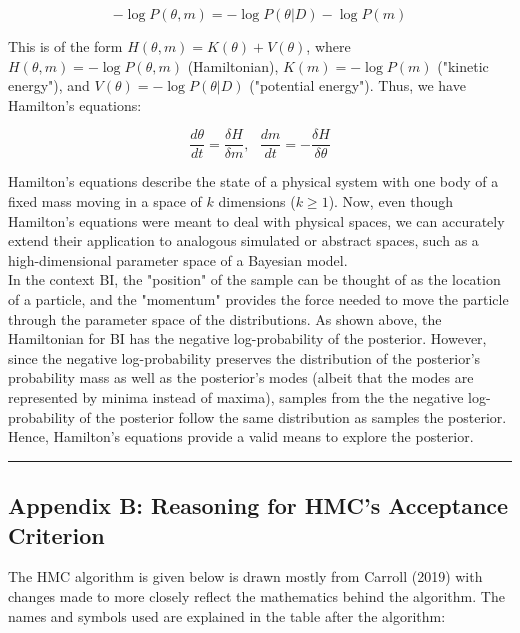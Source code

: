 \documentclass[conference]{IEEEtran}
\begin{document}
\begin{equation*}
	- \log P(\theta, m) = - \log P(\theta|D) - \log P(m)
\end{equation*}

This is of the form $H(\theta, m) = K(\theta) + V(\theta)$, where $H(\theta, m) = - \log P(\theta, m)$ (Hamiltonian),  $K(m) = - \log P(m)$ ("kinetic energy"), and $V(\theta) = - \log P(\theta|D)$ ("potential energy"). Thus, we have Hamilton's equations:

\begin{equation*}
	\frac{d \theta}{dt} = \frac{\delta H}{\delta m}, \text{ } \frac{dm}{dt} = - \frac{\delta H}{\delta \theta}
\end{equation*}

Hamilton's equations describe the state of a physical system with one body of a fixed mass moving in a space of $k$ dimensions ($k \geq 1$). Now, even though Hamilton's equations were meant to deal with physical spaces, we can accurately extend their application to analogous simulated or abstract spaces, such as a high-dimensional parameter space of a Bayesian model.\\

In the context BI, the "position" of the sample can be thought of as the location of a particle, and the "momentum" provides the force needed to move the particle through the parameter space of the distributions. As shown above, the Hamiltonian for BI has the negative log-probability of the posterior. However, since the negative log-probability preserves the distribution of the posterior's probability mass as well as the posterior's modes (albeit that the modes are represented by minima instead of maxima), samples from the the negative log-probability of the posterior follow the same distribution as samples the posterior. Hence, Hamilton's equations provide a valid means to explore the posterior.

\par\noindent\rule{0.49\textwidth}{0.1pt}

\subsection*{Appendix B: Reasoning for HMC's Acceptance Criterion}
The HMC algorithm is given below is drawn mostly from Carroll (2019) with changes made to more closely reflect the mathematics behind the algorithm. The names and symbols used are explained in the table after the algorithm:\\
\end{document}
